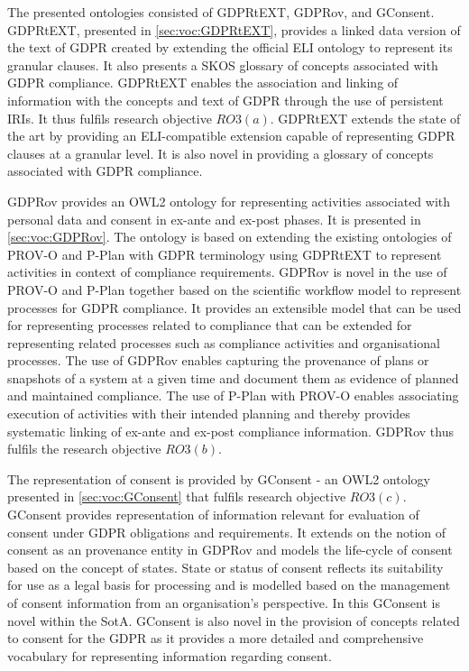 The presented ontologies consisted of GDPRtEXT, GDPRov, and GConsent.
GDPRtEXT, presented in \autoref{sec:voc:GDPRtEXT}, provides a linked data version of the text of GDPR created by extending the official ELI \cite{ELI_2012} ontology to represent its granular clauses. It also presents a SKOS glossary of concepts associated with GDPR compliance. GDPRtEXT enables the association and linking of information with the concepts and text of GDPR through the use of persistent IRIs. It thus fulfils research objective $RO3(a)$. GDPRtEXT extends the state of the art by providing an ELI-compatible extension capable of representing GDPR clauses at a granular level. It is also novel in providing a glossary of concepts associated with GDPR compliance.

GDPRov provides an OWL2 ontology for representing activities associated with personal data and consent in ex-ante and ex-post phases. It is presented in \autoref{sec:voc:GDPRov}.
The ontology is based on extending the existing ontologies of PROV-O \cite{lebo_prov-o_2013} and P-Plan \cite{garijo_p-plan_2014} with GDPR terminology using GDPRtEXT to represent activities in context of compliance requirements. GDPRov is novel in the use of PROV-O and P-Plan together based on the scientific workflow model to represent processes for GDPR compliance.
It provides an extensible model that can be used for representing processes related to compliance that can be extended for representing related  processes such as compliance activities and organisational processes.
The use of GDPRov enables capturing the provenance of plans or snapshots of a system at a given time and document them as evidence of planned and maintained compliance.
The use of P-Plan with PROV-O enables associating execution of activities with their intended planning and thereby provides systematic linking of ex-ante and ex-post compliance information.
GDPRov thus fulfils the research objective $RO3(b)$.

The representation of consent is provided by GConsent - an OWL2 ontology presented in \autoref{sec:voc:GConsent} that fulfils research objective $RO3(c)$.
GConsent provides representation of information relevant for evaluation of consent under GDPR obligations and requirements.
It extends on the notion of consent as an provenance entity in GDPRov and models the life-cycle of consent based on the concept of states.
State or status of consent reflects its suitability for use as a legal basis for processing and is modelled based on the management of consent information from an organisation's perspective. In this GConsent is novel within the SotA.
GConsent is also novel in the provision of concepts related to consent for the GDPR as it provides a more detailed and comprehensive vocabulary for representing information regarding consent.

